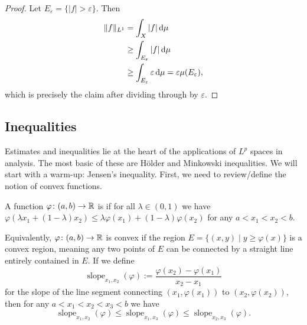 \begin{proof}
Let $E_{\varepsilon}=\{|f|>\varepsilon\}$. Then
\begin{subequations}
  \begin{align}
\|f\|_{L^{1}} &= \int_{X}|f|\,\mathrm{d}\mu\\
&\geq\int_{E_{\varepsilon}}|f|\,\mathrm{d}\mu\\
&\geq\int_{E_{\varepsilon}}\varepsilon\,\mathrm{d}\mu=\varepsilon\mu(E_{\varepsilon}),
  \end{align}
\end{subequations}
which is precisely the claim after dividing through by $\varepsilon$.
\end{proof}

\subsection{Inequalities}

\begin{node}
Estimates and inequalities lie at the heart of the applications of
$L^{p}$ spaces in analysis. The most basic of these are H\"{o}lder and
Minkowski inequalities. We will start with a warm-up: Jensen's inequality.
First, we need to review/define the notion of convex functions.
\end{node}

\begin{definition}
A function $\varphi\colon(a,b)\to\mathbb{R}$ is  if for all
$\lambda\in(0,1)$ we have $\varphi(\lambda x_{1}+(1-\lambda)x_{2})\leq\lambda\varphi(x_{1})+(1-\lambda)\varphi(x_{2})$
for any $a<x_{1}<x_{2}<b$.
\end{definition}

\begin{node}
Equivalently, $\varphi\colon(a,b)\to\mathbb{R}$ is convex if the region
$E=\{(x,y)\mid y\geq\varphi(x)\}$ is a convex region, meaning any two
points of $E$ can be connected by a straight line entirely contained
in $E$. If we define
\begin{equation}
\operatorname{slope}_{x_{1},x_{2}}(\varphi):=\frac{\varphi(x_{2})-\varphi(x_{1})}{x_{2}-x_{1}}
\end{equation}
for the slope of the line segment connecting $(x_{1},\varphi(x_{1}))$
to $(x_{2},\varphi(x_{2}))$, then for any $a<x_{1}<x_{2}<x_{3}<b$ we have
\begin{equation}
\operatorname{slope}_{x_{1},x_{2}}(\varphi)\leq
\operatorname{slope}_{x_{1},x_{3}}(\varphi)\leq
\operatorname{slope}_{x_{2},x_{3}}(\varphi).
\end{equation}
\end{node}

